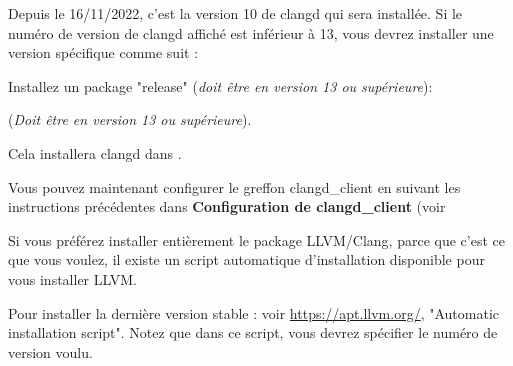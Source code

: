 Depuis le 16/11/2022, c'est la version 10 de clangd qui sera installée.\newline
Si le numéro de version de clangd affiché est inférieur à 13, vous devrez installer une version spécifique comme suit :

Installez un package "release" (\textit{doit être en version 13 ou supérieure}):

 (\textit{Doit être en version 13 ou supérieure}).

Cela installera clangd dans .

Vous pouvez maintenant configurer le greffon clangd\_client en suivant les instructions précédentes dans \textbf{Configuration de clangd\_client} (voir 

Si vous préférez installer entièrement le package LLVM/Clang, parce que c'est ce que vous voulez, il existe un script automatique d'installation disponible pour vous installer LLVM.

Pour installer la dernière version stable : voir \url{https://apt.llvm.org/}, "Automatic installation script".
Notez que dans ce script, vous devrez spécifier le numéro de version voulu.